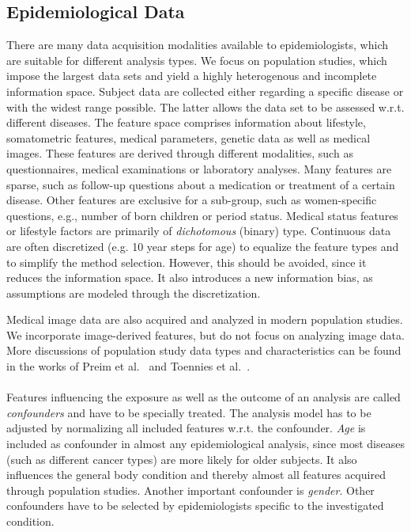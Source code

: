 \documentclass[journal]{style/vgtc} 			          %
\begin{document}
\subsection{Epidemiological Data} \label{sec:EpidemiologicalData}
There are many data acquisition modalities available to epidemiologists, which are suitable for different analysis types.
We focus on population studies, which impose the largest data sets and yield a highly heterogenous and incomplete information space.
Subject data are collected either regarding a specific disease or with the widest range possible.
The latter allows the data set to be assessed w.r.t. different diseases.
The feature space comprises information about lifestyle, somatometric features, medical parameters, genetic data as well as medical images.
These features are derived through different modalities, such as questionnaires, medical examinations or laboratory analyses.
Many features are sparse, such as follow-up questions about a medication or treatment of a certain disease.
Other features are exclusive for a sub-group, such as women-specific questions, e.g., number of born children or period status.
Medical status features or lifestyle factors are primarily of \emph{dichotomous} (binary) type.
Continuous data are often discretized (e.g. 10 year steps for age) to equalize the feature types and to simplify the method selection.
However, this should be avoided, since it reduces the information space.
It also introduces a new information bias, as assumptions are modeled through the discretization.

Medical image data are also acquired and analyzed in modern population studies.
We incorporate image-derived features, but do not focus on analyzing image data.
More discussions of population study data types and characteristics can be found in the works of Preim et al.~\cite{Preim2014} and Toennies et al.~\cite{Toennies2015}.
\\\\
Features influencing the exposure as well as the outcome of an analysis are called \emph{confounders} and have to be specially treated.
The analysis model has to be adjusted by normalizing all included features w.r.t. the confounder.
\emph{Age} is included as confounder in almost any epidemiological analysis, since most diseases (such as different cancer types) are more likely for older subjects.
It also influences the general body condition and thereby almost all features acquired through population studies.
Another important confounder is \emph{gender}.
Other confounders have to be selected by epidemiologists specific to the investigated condition.
\end{document}
